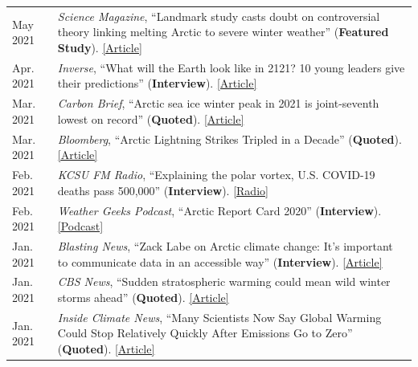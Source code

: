 \documentclass[margin,line,palatino,courier,10pt]{res}
\begin{document}
\begin{resume}
\begin{tabular}{@{}p{0.9in}p{4in}}
May 2021 & \textit{Science Magazine}, ``Landmark study casts doubt on controversial theory linking melting Arctic to severe winter weather'' (\textbf{Featured Study}). \href{https://www.sciencemag.org/news/2021/05/landmark-study-casts-doubt-controversial-theory-linking-melting-arctic-severe-winter}{[Article]}\\
Apr. 2021 & \textit{Inverse}, ``What will the Earth look like in 2121? 10 young leaders give their predictions'' (\textbf{Interview}). \href{https://www.inverse.com/science/the-future-of-earth-needs-them}{[Article]}\\
Mar. 2021 & \textit{Carbon Brief}, ``Arctic sea ice winter peak in 2021 is joint-seventh lowest on record'' (\textbf{Quoted}). \href{https://www.carbonbrief.org/arctic-sea-ice-winter-peak-in-2021-is-joint-seventh-lowest-on-record}{[Article]}\\
Mar. 2021 & \textit{Bloomberg}, ``Arctic Lightning Strikes Tripled in a Decade'' (\textbf{Quoted}). \href{https://www.bloomberg.com/news/articles/2021-03-23/arctic-lightning-tripled-in-a-decade-climate-change-may-be-to-blame}{[Article]}\\
Feb. 2021 & \textit{KCSU FM Radio}, ``Explaining the polar vortex, U.S. COVID-19 deaths pass 500,000'' (\textbf{Interview}). \href{http://kcsufm.com/2021/02/explaining-the-polar-vortex-u-s-covid-19-deaths-pass-500000/}{[Radio]}\\
Feb. 2021 & \textit{Weather Geeks Podcast}, ``Arctic Report Card 2020'' (\textbf{Interview}). \href{https://podcasts.apple.com/us/podcast/arctic-report-card-2020/id1373312240?i=1000507537964}{[Podcast]}\\
Jan. 2021 & \textit{Blasting News}, ``Zack Labe on Arctic climate change: It's important to communicate data in an accessible way'' (\textbf{Interview}). \href{https://us.blastingnews.com/opinion/2021/01/zack-labe-on-arctic-climate-change-its-important-to-communicate-data-in-an-accessible-way-003267614.html}{[Article]}\\
Jan. 2021 & \textit{CBS News}, ``Sudden stratospheric warming could mean wild winter storms ahead'' (\textbf{Quoted}). \href{https://www.cbsnews.com/news/stratospheric-warming-winter-weather-coming/}{[Article]}\\
Jan. 2021 & \textit{Inside Climate News}, ``Many Scientists Now Say Global Warming Could Stop Relatively Quickly After Emissions Go to Zero'' (\textbf{Quoted}). \href{https://insideclimatenews.org/news/03012021/five-aspects-climate-change-2020/}{[Article]}\\

\end{tabular}
\end{resume}
\end{document}
